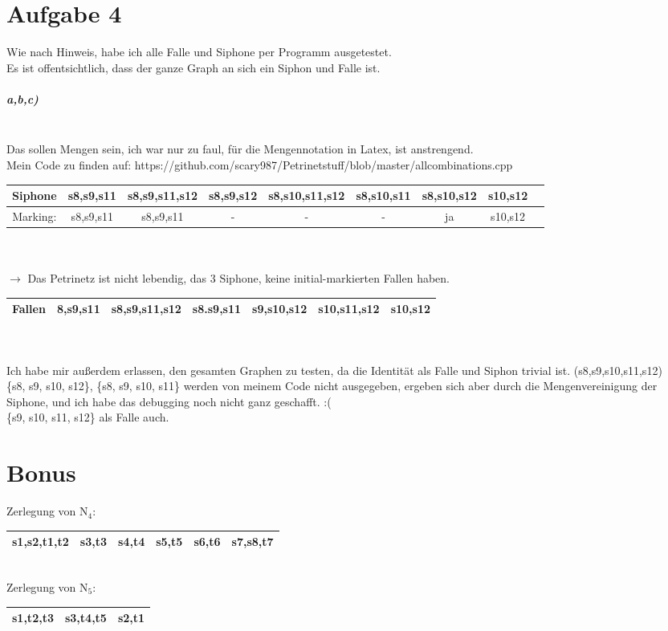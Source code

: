 \documentclass[]{article}
\begin{document}
\section{Aufgabe 4}
Wie nach Hinweis, habe ich alle Falle und Siphone per Programm ausgetestet.\\
Es ist offentsichtlich, dass der ganze Graph an sich ein Siphon und Falle ist.
\subparagraph{a,b,c)} \ \\ Das sollen Mengen sein, ich war nur zu faul, für die Mengennotation in Latex, ist anstrengend. \\ Mein Code zu finden auf: https://github.com/scary987/Petrinetstuff/blob/master/allcombinations.cpp \\
\begin{tabular}{||c|c|c|c|c|c|c|c|c||} 
	\hline
	Siphone & s8,s9,s11 & s8,s9,s11,s12 & s8,s9,s12 & s8,s10,s11,s12 & s8,s10,s11 & s8,s10,s12 & s10,s12 &    \\
	\hline
	Marking: & s8,s9,s11 & s8,s9,s11 &  - & - & -  & ja & s10,s12&    \\
	\hline
\end{tabular}\\ \ \\
$\rightarrow$ Das Petrinetz ist nicht lebendig, das 3 Siphone, keine initial-markierten Fallen haben.
\begin{tabular}{|c|c|c|c|c|c|c|}
	\hline
	Fallen &8,s9,s11 & s8,s9,s11,s12  & s8.s9,s11 & s9,s10,s12 & s10,s11,s12 & s10,s12 \\
	\hline
\end{tabular}\\ \ \\
Ich habe mir außerdem erlassen, den gesamten Graphen zu testen, da die Identität als Falle und Siphon trivial ist. (s8,s9,s10,s11,s12)\\
\{s8, s9, s10, s12\},
\{s8, s9, s10, s11\} werden von meinem Code nicht ausgegeben, ergeben sich aber durch die Mengenvereinigung der Siphone, und ich habe das debugging noch nicht ganz geschafft. :(\\
\{s9, s10, s11, s12\} als Falle auch. 










\section{Bonus}
Zerlegung von N$_4$:\\
\begin{tabular}{|c|c|c|c|c|c|}
	\hline
	s1,s2,t1,t2 & s3,t3 & s4,t4 & s5,t5 & s6,t6 & s7,s8,t7 \\
	\hline
\end{tabular}
\\
Zerlegung von N$_5$:\\
\begin{tabular}{|c|c|c|}
	\hline
	s1,t2,t3 & s3,t4,t5 & s2,t1 \\
	\hline
\end{tabular}
\end{document}
